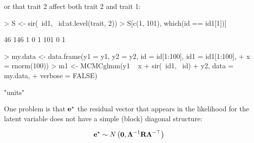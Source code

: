 \documentclass{article}
\begin{document}
or that trait 2 affect both trait 2 and trait 1:

\begin{Schunk}
\begin{Sinput}
> S <- sir(~id1, ~id:at.level(trait, 2))
> S[c(1, 101), which(id == id1[1])]
\end{Sinput}
\begin{Soutput}
    46 146
1    0   1
101  0   1
\end{Soutput}
\end{Schunk}


\begin{Schunk}
\begin{Sinput}
> my.data <- data.frame(y1 = y1, y2 = y2, id = id[1:100], id1 = id1[1:100], 
+     x = rnorm(100))
> m1 <- MCMCglmm(y1 ~ x + sir(~id1, ~id) + y2, data = my.data, 
+     verbose = FALSE)
\end{Sinput}
\begin{Soutput}
[1] "units"
\end{Soutput}
\end{Schunk}

One problem is that ${\bf e}^{\star}$ the residual vector that appears in the likelihood for the latent variable does not have a simple (block) diagonal structure:

\begin{equation}
{\bf e}^{\star} \sim N\left({\bm 0}, {\bm \Lambda}^{-1}{\bf R}{\bm \Lambda}^{-\top}\right)
\end{equation}





\ifalone
\end{document}
